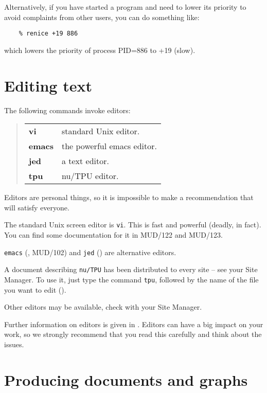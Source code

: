 Alternatively, if you have started a program and need to lower its priority
to avoid complaints from other users, you can do something like:
\begin{verbatim}
    % renice +19 886
\end{verbatim}
which lowers the priority of process PID=886 to +19 (slow).

\newpage

\section{Editing text}

The following commands invoke editors:
\begin{quote}
\begin{tabular}{lp{67mm}}

{\bf vi}    & standard Unix editor.\\
{\bf emacs} & the powerful emacs editor.\\
{\bf jed}   & a text editor.\\
{\bf tpu}   & nu/TPU editor.

\end{tabular}
\end{quote}
Editors are personal things, so it is impossible to make a recommendation
that will satisfy everyone.

The standard Unix screen editor is {\tt vi}.
This is fast and powerful (deadly, in fact).
You can find some documentation for it in MUD/122 and MUD/123.

{\tt emacs} 
(, MUD/102) and {\tt jed}
() are alternative editors.

A document describing {\tt nu/TPU} has been distributed to every site --
see your Site Manager. To use it, just type the command {\tt tpu},
followed by the name of the file you want to edit
().

Other editors may be available, check with your Site Manager.

Further information on editors is given in
.
Editors can have a big impact on your work, so we strongly recommend that you
read this carefully and think about the issues.

\newpage

\section{Producing documents and graphs}

